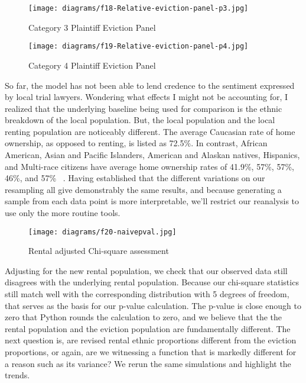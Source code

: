 \begin{figure}
  \begin{center}
    \texttt{[image: diagrams/f18-Relative-eviction-panel-p3.jpg]}
  \end{center}
  \caption{Category 3 Plaintiff Eviction Panel}
\label{fig:figure18}
\end{figure}

\begin{figure}
  \begin{center}
    \texttt{[image: diagrams/f19-Relative-eviction-panel-p4.jpg]}
  \end{center}
  \caption{Category 4 Plaintiff Eviction Panel}
\label{fig:figure19}
\end{figure}

\par So far, the model has not been able to lend credence to the sentiment expressed by local trial lawyers.  Wondering what effects I might not be accounting for, I realized that the underlying baseline being used for comparison is the ethnic breakdown of the local population.  But, the local population and the local renting population are noticeably different.  The average Caucasian rate of home ownership, as opposed to renting, is listed as 72.5\%.  In contrast, African American, Asian and Pacific Islanders, American and Alaskan natives, Hispanics, and Multi-race citizens have average home ownership rates of 41.9\%, 57\%, 57\%, 46\%, and 57\% ~\citep{website:15}.  Having established that the different variations on our resampling all give demonstrably the same results, and because generating a sample from each data point is more interpretable, we’ll restrict our reanalysis to use only the more routine tools.

\begin{wrapfigure}{r}{2in}
\texttt{[image: diagrams/f20-naivepval.jpg]}
\caption{Rental adjusted Chi-square assessment}
\label{fig:figure20}
\end{wrapfigure}

\par Adjusting for the new rental population, we check that our observed data still disagrees with the underlying rental population.  Because our chi-square statistics still match well with the corresponding distribution with 5 degrees of freedom, that serves as the basis for our p-value calculation.  The p-value is close enough to zero that Python rounds the calculation to zero, and we believe that the the rental population and the eviction population are fundamentally different.  The next question is, are revised rental ethnic proportions different from the eviction proportions, or again, are we witnessing a function that is markedly different for a reason such as its variance?  We rerun the same simulations and highlight the trends.


